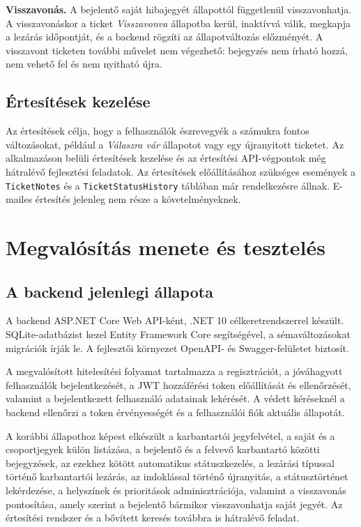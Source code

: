 \documentclass[12pt, a4paper, twoside]{article}
\begin{document}
\textbf{Visszavonás.} A bejelentő saját hibajegyét állapottól függetlenül visszavonhatja. A visszavonáskor a ticket \textit{Visszavonva} állapotba kerül, inaktívvá válik, megkapja a lezárás időpontját, és a backend rögzíti az állapotváltozás előzményét. A visszavont ticketen további művelet nem végezhető: bejegyzés nem írható hozzá, nem vehető fel és nem nyitható újra.

\subsection{Értesítések kezelése}

Az értesítések célja, hogy a felhasználók észrevegyék a számukra fontos változásokat, például a \textit{Válaszra vár} állapotot vagy egy újranyitott ticketet. Az alkalmazáson belüli értesítések kezelése és az értesítési API-végpontok még hátralévő fejlesztési feladatok. Az értesítések előállításához szükséges események a \texttt{TicketNotes} és a \texttt{TicketStatusHistory} táblában már rendelkezésre állnak. E-mailes értesítés jelenleg nem része a követelményeknek.

\section{Megvalósítás menete és tesztelés}

\subsection{A backend jelenlegi állapota}

A backend ASP.NET Core Web API-ként, .NET 10 célkeretrendszerrel készült. SQLite-adatbázist kezel Entity Framework Core segítségével, a sémaváltozásokat migrációk írják le. A fejlesztői környezet OpenAPI- és Swagger-felületet biztosít.

A megvalósított hitelesítési folyamat tartalmazza a regisztrációt, a jóváhagyott felhasználók bejelentkezését, a JWT hozzáférési token előállítását és ellenőrzését, valamint a bejelentkezett felhasználó adatainak lekérését. A védett kéréseknél a backend ellenőrzi a token érvényességét és a felhasználói fiók aktuális állapotát.

A korábbi állapothoz képest elkészült a karbantartói jegyfelvétel, a saját és a csoportjegyek külön listázása, a bejelentő és a felvevő karbantartó közötti bejegyzések, az ezekhez kötött automatikus státuszkezelés, a lezárási típussal történő karbantartói lezárás, az indoklással történő újranyitás, a státusztörténet lekérdezése, a helyszínek és prioritások adminisztrációja, valamint a visszavonás pontosítása, amely szerint a bejelentő bármikor visszavonhatja saját jegyét. Az értesítési rendszer és a bővített keresés továbbra is hátralévő feladat.
\end{document}
